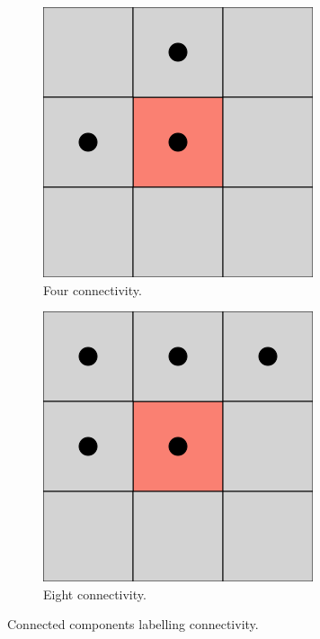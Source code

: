 \begin{figure}[h]
    \centering
    \begin{subfigure}[b]{0.3\textwidth}
        \centering
        \includegraphics[width=0.5\linewidth]{figures/detection/square_4_connectivity.png}
        \caption{Four connectivity.}
        \label{fig:four_connectivity}
    \end{subfigure}
    \quad
    \begin{subfigure}[b]{0.3\textwidth}
        \centering
        \includegraphics[width=0.5\linewidth]{figures/detection/square_8_connectivity.png}
        \caption{Eight connectivity.}
        \label{fig:eight_connectivity}
    \end{subfigure}
    \caption{Connected components labelling connectivity.}
    \label{fig:ccl_connectivity}
\end{figure}

